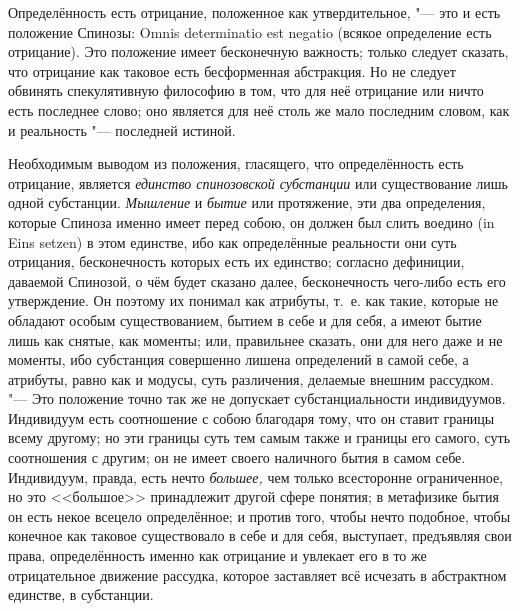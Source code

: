 Определённость есть отрицание, положенное как утвердительное, "--- это и есть
положение Спинозы: Omnis deter\-minatio est negatio (всякое определение есть
отрицание). Это положение имеет
бесконечную важность; только следует сказать, что отрицание как таковое
есть бесформенная абстракция. Но не следует обвинять спекулятивную
философию в том, что для неё отрицание или ничто есть последнее слово; оно
является для неё столь же мало последним словом, как и реальность
"--- последней истиной.

Необходимым выводом из положения, гласящего, что определённость есть
отрицание, является {\em единство спинозовской
субстанции} или существование лишь одной субстанции.
{\em Мышление} и {\em бытие} или
протяжение, эти два определения, которые Спиноза именно имеет перед собою,
он должен был слить воедино (in Eins setzen) в этом единстве, ибо как
определённые реальности они суть отрицания, бесконечность которых есть их
единство; согласно дефиниции, даваемой Спинозой, о чём будет сказано далее,
бесконечность чего-либо есть его утверждение. Он поэтому их понимал как
атрибуты, т.~е. как такие, которые не обладают особым существованием,
бытием в себе и для себя, а имеют бытие лишь как снятые, как моменты; или,
правильнее сказать, они для него даже и не моменты, ибо субстанция
совершенно лишена определений в самой себе, а атрибуты, равно как и модусы,
суть различения, делаемые внешним рассудком. "--- Это положение точно так же
не допускает субстанциальности индивидуумов. Индивидуум есть соотношение с
собою благодаря тому, что он ставит границы всему другому; но эти границы
суть тем самым также и границы его самого, суть соотношения с другим; он не
имеет своего наличного бытия в самом себе. Индивидуум, правда, есть нечто
{\em большее,} чем только всесторонне ограниченное, но
это <<большое>> принадлежит другой сфере понятия; в метафизике бытия он есть
некое всецело определённое; и против того, чтобы нечто подобное, чтобы
конечное как таковое существовало в себе и для себя, выступает, предъявляя
свои права, определённость именно как отрицание и увлекает его в то же
отрицательное движение рассудка, которое заставляет всё исчезать в
абстрактном единстве, в субстанции.

